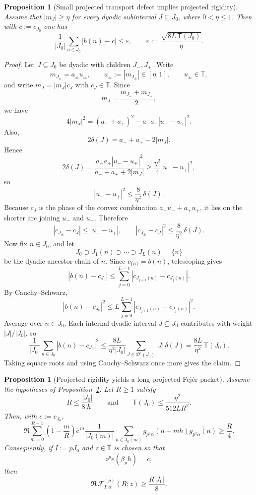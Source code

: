\documentclass[11pt]{scrartcl}
\numberwithin{equation}{section}
\newtheorem{proposition}[theorem]{Proposition}
\theoremstyle{definition}
\newcommand{\T}{\mathbb T}
\newcommand{\1}{\mathbf 1}
\newcommand{\ee}[1]{e\!\left(#1\right)}
\begin{document}
\begin{proposition}[Small projected transport defect implies projected rigidity]
\label{prop:projected-rigidity}
Assume that $|m_J|\ge \eta$ for every dyadic subinterval $J\subseteq J_0$, where $0<\eta\le 1$. Then with $c:=c_{J_0}$ one has
\[
\frac1{|J_0|}\sum_{n\in J_0}|b(n)-c|
\le
\varepsilon,
\qquad
\varepsilon:=\frac{\sqrt{8L\,\mathsf T(J_0)}}{\eta}.
\]
\end{proposition}

\begin{proof}
Let $J\subseteq J_0$ be dyadic with children $J_-,J_+$. Write
\[
m_{J_\pm}=a_\pm u_\pm,
\qquad
a_\pm:=|m_{J_\pm}|\in [\eta,1],
\qquad
u_\pm\in\T,
\]
and write $m_J=|m_J|c_J$ with $c_J\in\T$. Since
\[
m_J=\frac{m_{J_-}+m_{J_+}}{2},
\]
we have
\[
4|m_J|^2=(a_-+a_+)^2-a_-a_+|u_--u_+|^2.
\]
Also,
\[
2\delta(J)=a_-+a_+-2|m_J|.
\]
Hence
\[
2\delta(J)=\frac{a_-a_+|u_--u_+|^2}{a_-+a_++2|m_J|}
\ge \frac{\eta^2}{4}|u_--u_+|^2,
\]
so
\[
|u_--u_+|^2\le \frac{8}{\eta^2}\,\delta(J).
\]
Because $c_J$ is the phase of the convex combination $a_-u_-+a_+u_+$, it lies on the shorter arc joining $u_-$ and $u_+$. Therefore
\[
|c_{J_\pm}-c_J|\le |u_--u_+|,
\qquad
|c_{J_\pm}-c_J|^2\le \frac{8}{\eta^2}\,\delta(J).
\]
Now fix $n\in J_0$, and let
\[
J_0\supset J_1(n)\supset \cdots \supset J_L(n)=\{n\}
\]
be the dyadic ancestor chain of $n$. Since $c_{\{n\}}=b(n)$, telescoping gives
\[
|b(n)-c_{J_0}|
\le \sum_{j=0}^{L-1}|c_{J_{j+1}(n)}-c_{J_j(n)}|.
\]
By Cauchy--Schwarz,
\[
|b(n)-c_{J_0}|^2
\le L\sum_{j=0}^{L-1}|c_{J_{j+1}(n)}-c_{J_j(n)}|^2.
\]
Average over $n\in J_0$. Each internal dyadic interval $J\subsetneq J_0$ contributes with weight $|J|/|J_0|$, so
\[
\frac1{|J_0|}\sum_{n\in J_0}|b(n)-c_{J_0}|^2
\le \frac{8L}{\eta^2|J_0|}
\sum_{J\in\mathcal D^\circ(J_0)} |J|\,\delta(J)
=
\frac{8L}{\eta^2}\,\mathsf T(J_0).
\]
Taking square roots and using Cauchy--Schwarz once more gives the claim.
\end{proof}

\begin{proposition}[Projected rigidity yields a long projected Fej\'er packet]
\label{prop:projected-rigidity-to-packet}
Assume the hypotheses of Proposition~\ref{prop:projected-rigidity}. Let $R\ge 1$ satisfy
\[
R\le \frac{|J_0|}{8|h|}
\qquad\text{and}\qquad
\mathsf T(J_0)\le \frac{\eta^2}{512LR^2}.
\]
Then, with $c:=c_{J_0}$,
\[
\Re\sum_{m=0}^{R-1}\left(1-\frac{m}{R}\right)
\overline c^{\,m}
\frac1{|J_0(m)|}
\sum_{n\in J_0(m)} g_{p^2\alpha}(n+mh)\overline{g_{p^2\alpha}(n)}
\ge \frac{R}{4}.
\]
Consequently, if $I:=pJ_0$ and $z\in\T$ is chosen so that
\[
z^p\ee{\beta_ph}=\overline c,
\]
then
\[
\Re\,\mathcal F^{(p)}_{I,\alpha}(R;z)
\ge \frac{R|J_0|}{8}.
\]
\end{proposition}
\end{document}
